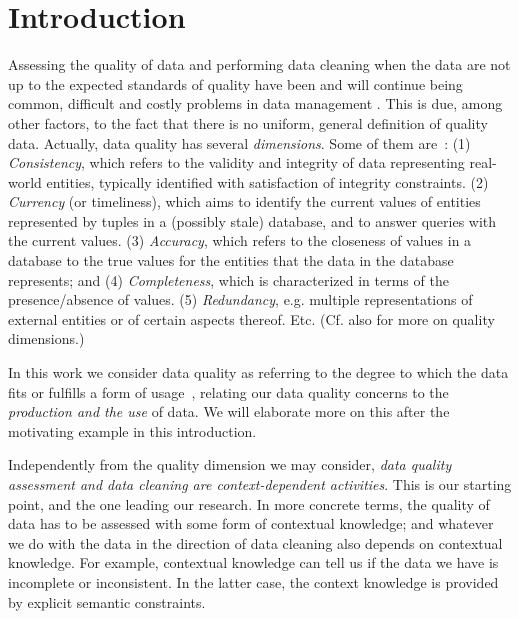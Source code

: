 \documentclass[format=acmsmall, review=false, screen=true]{acmart}
\begin{document}
\section{Introduction}\label{sec:intr}

Assessing the quality of data and performing data cleaning when the data are not up to the expected standards of quality have been and will
continue being common, difficult and costly problems in data management \cite{batini,eckerson,redman}. This is due, among other factors, to the fact that there is no uniform, general definition of quality data. Actually,
data quality  has several {\em dimensions}. Some of them are~\cite{batini}: (1) {\em Consistency}, which refers to the validity and integrity of data representing real-world entities, typically identified with satisfaction of integrity constraints. (2) {\em Currency} (or timeliness), which aims to identify the current values of entities represented by tuples in a (possibly stale) database, and to answer queries with the current values. (3) {\em Accuracy}, which refers to the closeness of values in a database to the true values for the entities that the data in the database represents; and (4) {\em Completeness}, which  is characterized in terms of the presence/absence of values. (5) {\em Redundancy}, e.g. multiple representations of external entities or of certain aspects thereof. Etc. (Cf. also \cite{lei,fan,geerts} for more on quality dimensions.)

In this work we consider data quality as referring  to the degree to which the data fits or fulfills a form of usage~\cite{batini}, relating our data quality concerns to the {\em production and the use} of data. We will elaborate more on this after the motivating example in this introduction.







Independently from the quality dimension we may consider, {\em data quality assessment and data cleaning are context-dependent activities}. This is our starting point, and the one leading our research. In more concrete terms, the quality of data has to be assessed with some form of  contextual knowledge; and whatever we do with the data in the direction of data cleaning also depends on contextual knowledge. For example, contextual knowledge can tell us if the data we have is incomplete or inconsistent. In the latter case, the context knowledge is provided by explicit semantic constraints.
\end{document}
